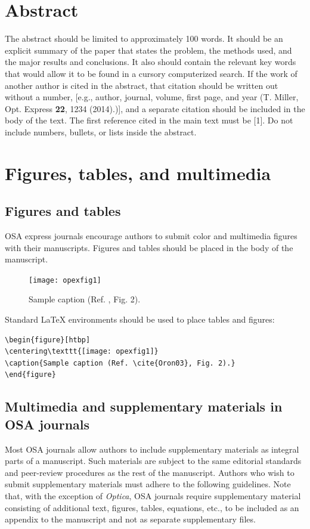 \documentclass[10pt,letterpaper]{article}
\begin{document}
\section{Abstract}
The abstract should be limited to approximately 100 words. It should be an explicit summary of the paper that states the problem, the methods used, and the major results and conclusions. It also should contain the relevant key words that would allow it to be found in a cursory computerized search. If the work of another author is cited in the abstract, that citation should be written out without a number, [e.g., author, journal, volume, first page, and year (T. Miller, Opt. Express {\bf 22}, 1234 (2014).)], and a separate citation should be included in the body of the text. The first reference cited in the main text must be [1]. Do not include numbers, bullets, or lists inside the abstract.

\section{Figures, tables, and multimedia}

\subsection{Figures and tables}

OSA express journals encourage authors to submit color and multimedia figures with their manuscripts. Figures and tables should be placed in the body of the manuscript.

\begin{figure}[h]
\centering\texttt{[image: opexfig1]}
\caption{Sample caption (Ref. \cite{Oron03}, Fig. 2).}
\end{figure}

\noindent Standard \LaTeX{} environments should be used to place tables and figures:
\begin{verbatim}
\begin{figure}[htbp]
\centering\texttt{[image: opexfig1]}
\caption{Sample caption (Ref. \cite{Oron03}, Fig. 2).}
\end{figure}
\end{verbatim}

\subsection{Multimedia and supplementary materials in OSA journals}

Most OSA journals allow authors to include supplementary materials as integral parts of a manuscript. Such materials are subject to the same editorial standards and peer-review procedures as the rest of the manuscript. Authors who wish to submit supplementary materials must adhere to the following guidelines. Note that, with the exception of \textit{Optica}, OSA journals require supplementary material consisting of additional text, figures, tables, equations, etc., to be included as an appendix to the manuscript and not as separate supplementary files.
\end{document}
